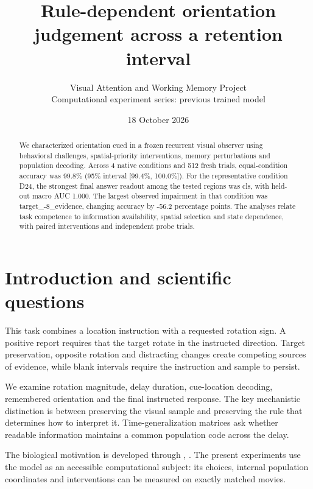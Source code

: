 \documentclass[11pt]{article}
\begin{document}
\title{\color{ink}Rule-dependent orientation judgement across a retention interval}
\author{Visual Attention and Working Memory Project\\Computational experiment series: previous trained model}\date{18 October 2026}\maketitle
\begin{abstract}
We characterized orientation cued in a frozen recurrent visual observer using behavioral challenges, spatial-priority interventions, memory perturbations and population decoding. Across 4 native conditions and 512 fresh trials, equal-condition accuracy was 99.8\% (95\% interval [99.4\%, 100.0\%]). For the representative condition D24, the strongest final answer readout among the tested regions was cls, with held-out macro AUC 1.000. The largest observed impairment in that condition was target\_\allowbreak{}-8\_\allowbreak{}evidence, changing accuracy by -56.2 percentage points. The analyses relate task competence to information availability, spatial selection and state dependence, with paired interventions and independent probe trials.
\end{abstract}
\section{Introduction and scientific questions}
This task combines a location instruction with a requested rotation sign. A positive report requires that the target rotate in the instructed direction. Target preservation, opposite rotation and distracting changes create competing sources of evidence, while blank intervals require the instruction and sample to persist.

We examine rotation magnitude, delay duration, cue-location decoding, remembered orientation and the final instructed response. The key mechanistic distinction is between preserving the visual sample and preserving the rule that determines how to interpret it. Time-generalization matrices ask whether readable information maintains a common population code across the delay.

The biological motivation is developed through \cite{spatial}, \cite{stokes}. The present experiments use the model as an accessible computational subject: its choices, internal population coordinates and interventions can be measured on exactly matched movies.
\end{document}

